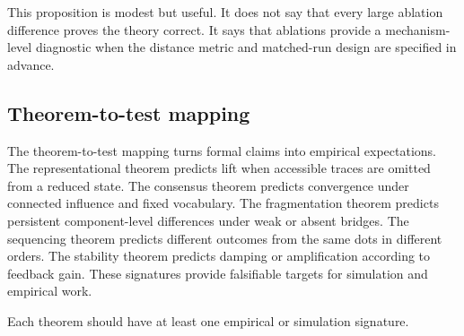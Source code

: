 \documentclass[11pt]{article}
\theoremstyle{remark}
\begin{document}
This proposition is modest but useful. It does not say that every large
ablation difference proves the theory correct. It says that ablations provide a
mechanism-level diagnostic when the distance metric and matched-run design are
specified in advance.

\subsection{Theorem-to-test mapping}\label{theorem-to-test-mapping}

The theorem-to-test mapping turns formal claims into empirical expectations. The representational theorem predicts lift when accessible traces are omitted from a reduced state. The consensus theorem predicts convergence under connected influence and fixed vocabulary. The fragmentation theorem predicts persistent component-level differences under weak or absent bridges. The sequencing theorem predicts different outcomes from the same dots in different orders. The stability theorem predicts damping or amplification according to feedback gain. These signatures provide falsifiable targets for simulation and empirical work.


Each theorem should have at least one empirical or simulation signature.
\end{document}
